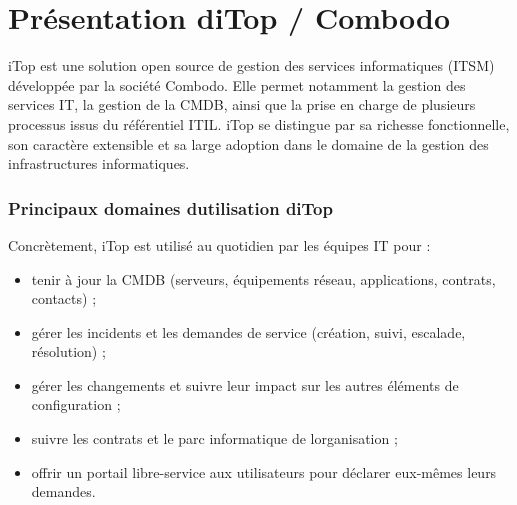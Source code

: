 \chapter{Présentation d\textquotesingle iTop / Combodo}


iTop est une solution open source de gestion des services informatiques (ITSM) développée par la société Combodo. Elle permet notamment la gestion des services IT, la gestion de la CMDB, ainsi que la prise en charge de plusieurs processus issus du référentiel ITIL. iTop se distingue par sa richesse fonctionnelle, son caractère extensible et sa large adoption dans le domaine de la gestion des infrastructures informatiques.

\subsection{Principaux domaines d\textquotesingle utilisation d\textquotesingle iTop}

Concrètement, iTop est utilisé au quotidien par les équipes IT pour :

\begin{itemize}
\item
  tenir à jour la CMDB (serveurs, équipements réseau, applications, contrats, contacts) ;
\item
  gérer les incidents et les demandes de service (création, suivi, escalade, résolution) ;
\item
  gérer les changements et suivre leur impact sur les autres éléments de configuration ;
\item
  suivre les contrats et le parc informatique de l\textquotesingle organisation ;
\item
  offrir un portail libre-service aux utilisateurs pour déclarer eux-mêmes leurs demandes.
\end{itemize}



